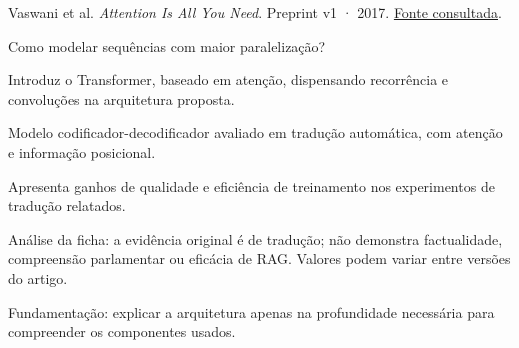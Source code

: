 {\small Vaswani et al. \textit{Attention Is All You Need}. Preprint v1 · 2017. \href{https://arxiv.org/pdf/1706.03762v1}{Fonte consultada}.\par}

Como modelar sequências com maior paralelização?

Introduz o Transformer, baseado em atenção, dispensando recorrência e convoluções na arquitetura proposta.

Modelo codificador-decodificador avaliado em tradução automática, com atenção e informação posicional.

Apresenta ganhos de qualidade e eficiência de treinamento nos experimentos de tradução relatados.

\begin{itemize}
\end{itemize}

Análise da ficha: a evidência original é de tradução; não demonstra factualidade, compreensão parlamentar ou eficácia de RAG. Valores podem variar entre versões do artigo.

Fundamentação: explicar a arquitetura apenas na profundidade necessária para compreender os componentes usados.

